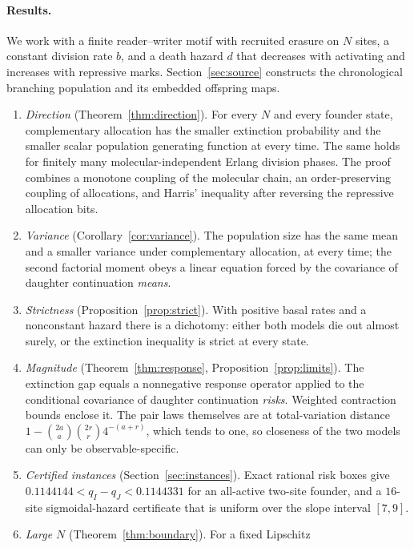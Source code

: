 \documentclass[11pt]{article}
\theoremstyle{remark}
\begin{document}
\paragraph{Results.}
We work with a finite reader--writer motif with recruited erasure
\cite{dodd2007,bruno2022,bruno2024} on $N$ sites, a constant division rate
$b$, and a death hazard $d$ that decreases with activating and increases with
repressive marks. Section~\ref{sec:source} constructs the chronological
branching population and its embedded offspring maps.
\begin{enumerate}
\item \emph{Direction} (Theorem~\ref{thm:direction}). For every $N$ and every
founder state, complementary allocation has the smaller extinction
probability and the smaller scalar population generating function at every
time. The same holds for finitely many molecular-independent Erlang division
phases. The proof combines a monotone coupling of the molecular chain, an
order-preserving coupling of allocations, and Harris' inequality
\cite{harris1960,esary1967} after reversing the repressive allocation bits.
\item \emph{Variance} (Corollary~\ref{cor:variance}). The population size has
the same mean and a smaller variance under complementary allocation, at every
time; the second factorial moment obeys a linear equation forced by the
covariance of daughter continuation \emph{means}.
\item \emph{Strictness} (Proposition~\ref{prop:strict}). With positive basal
rates and a nonconstant hazard there is a dichotomy: either both models die
out almost surely, or the extinction inequality is strict at every state.
\item \emph{Magnitude} (Theorem~\ref{thm:response},
Proposition~\ref{prop:limits}). The extinction gap equals a nonnegative
response operator applied to the conditional covariance of daughter
continuation \emph{risks}. Weighted contraction bounds enclose it. The pair
laws themselves are at total-variation distance
$1-\binom{2a}{a}\binom{2r}{r}4^{-(a+r)}$, which tends to one, so closeness of
the two models can only be observable-specific.
\item \emph{Certified instances} (Section~\ref{sec:instances}). Exact rational
risk boxes give $0.1144144<q_I-q_J<0.1144331$ for an all-active two-site
founder, and a $16$-site sigmoidal-hazard certificate that is uniform over
the slope interval $[7,9]$.
\item \emph{Large $N$} (Theorem~\ref{thm:boundary}). For a fixed Lipschitz

\end{enumerate}
\end{document}
